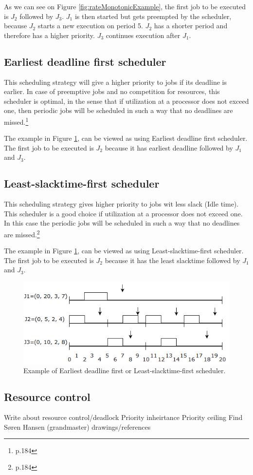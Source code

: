 As we can see on Figure \ref{fig:rateMonotonicExample}, the first job to be executed is $J_2$ followed by $J_3$. $J_1$ is then started but gets preempted by the scheduler, because $J_2$ starts a new execution on period 5. $J_2$ has a shorter period and therefore has a higher priority. $J_3$ continues execution after $J_1$.

\subsection{Earliest deadline first scheduler}
This scheduling strategy will give a higher priority to jobs if its deadline is
earlier. In case of preemptive jobs and no competition for resources, this scheduler
is optimal, in the sense that if utilization at a processor does not exceed one, then
periodic jobs will be scheduled in such a way that no deadlines are missed.\footnote{\cite{Fokkink1965} p.184}

The example in Figure \ref{fig:EarliestDeadlineFirstAndLeastSlacktimeFirstSchedulerExample}, can be viewed as using Earliest deadline first scheduler. The first job to be executed is $J_2$ because it has earliest deadline followed by $J_1$ and $J_3$.

\subsection{Least-slacktime-first scheduler}
This scheduling strategy gives higher priority to jobs wit less slack (Idle time). This scheduler is a good choice if utilization at a processor does not exceed one. In this case the periodic jobs will be scheduled in such a way that no deadlines are missed.\footnote{\cite{Fokkink1965} p.184}

The example in Figure \ref{fig:EarliestDeadlineFirstAndLeastSlacktimeFirstSchedulerExample}, can be viewed as using Least-slacktime-first scheduler. The first job to be executed is $J_2$ because it has the least slacktime followed by $J_1$ and $J_3$.

\begin{figure}[h!]\label{}
	\centering
	\includegraphics[scale=0.5]{realTimeComputing/fig/EarliestDeadlineFirst.png}
	\caption{Example of Earliest deadline first or Least-slacktime-first scheduler.}
	\label{fig:EarliestDeadlineFirstAndLeastSlacktimeFirstSchedulerExample}
\end{figure}

\subsection{Resource control}
Write about resource control/deadlock
Priority inheirtance
Priority ceiling
Find Søren Hansen (grandmaster) drawings/references